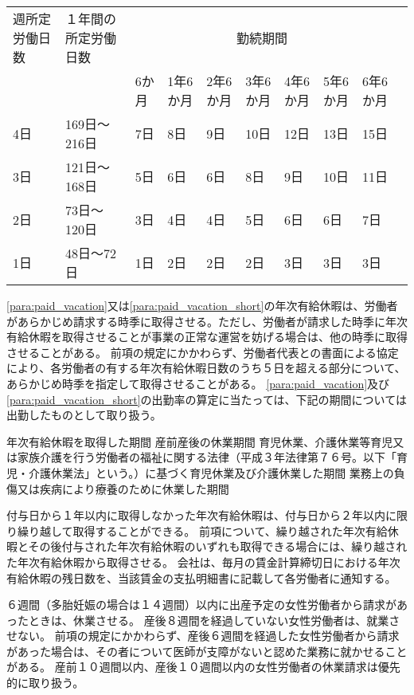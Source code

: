 \documentclass[10pt,a4paper,uplatex]{jsarticle}
\begin{document}
\hspace{2cm}\begin{tabular}{|p{3em}|p{6.5em}|p{2.5em}|p{2.5em}|p{2.5em}|p{2.5em}|p{2.5em}|p{2.5em}|p{2.5em}|p{2.5em}|} \hline
  週所定労働日数 & １年間の所定労働日数 & \multicolumn{7}{|c|}{勤続期間} \\ \cline{3-9}
  & & 6か月 & 1年6か月& 2年6か月& 3年6か月& 4年6か月& 5年6か月& 6年6か月 \\ \hline \hline
  4日 & 169日～216日 & 7日 & 8日& 9日& 10日& 12日& 13日& 15日 \\ \hline
  3日 & 121日～168日 & 5日 & 6日& 6日&  8日&  9日& 10日& 11日 \\ \hline
  2日 & 73日～120日  & 3日 & 4日& 4日&  5日&  6日&  6日&  7日 \\ \hline
  1日 & 48日～72日   & 1日 & 2日& 2日&  2日&  3日&  3日&  3日 \\ \hline
\end{tabular}

\label{para:paid_vacation_short}
\term
\ref{para:paid_vacation}又は\ref{para:paid_vacation_short}の年次有給休暇は、労働者があらかじめ請求する時季に取得させる。ただし、労働者が請求した時季に年次有給休暇を取得させることが事業の正常な運営を妨げる場合は、他の時季に取得させることがある。
\term
前項の規定にかかわらず、労働者代表との書面による協定により、各労働者の有する年次有給休暇日数のうち５日を超える部分について、あらかじめ時季を指定して取得させることがある。
\term
\ref{para:paid_vacation}及び\ref{para:paid_vacation_short}の出勤率の算定に当たっては、下記の期間については出勤したものとして取り扱う。
\begin{enumerate}
    \itm 年次有給休暇を取得した期間
    \itm 産前産後の休業期間
    \itm 育児休業、介護休業等育児又は家族介護を行う労働者の福祉に関する法律（平成３年法律第７６号。以下「育児・介護休業法」という。）に基づく育児休業及び介護休業した期間
    \itm 業務上の負傷又は疾病により療養のために休業した期間
\end{enumerate}
\term
付与日から１年以内に取得しなかった年次有給休暇は、付与日から２年以内に限り繰り越して取得することができる。
\term
前項について、繰り越された年次有給休暇とその後付与された年次有給休暇のいずれも取得できる場合には、繰り越された年次有給休暇から取得させる。
\term
会社は、毎月の賃金計算締切日における年次有給休暇の残日数を、当該賃金の支払明細書に記載して各労働者に通知する。



６週間（多胎妊娠の場合は１４週間）以内に出産予定の女性労働者から請求があったときは、休業させる。
\term
産後８週間を経過していない女性労働者は、就業させない。
\term
前項の規定にかかわらず、産後６週間を経過した女性労働者から請求があった場合は、その者について医師が支障がないと認めた業務に就かせることがある。
\term
産前１０週間以内、産後１０週間以内の女性労働者の休業請求は優先的に取り扱う。
 
\end{document}
